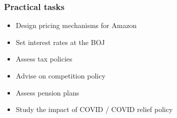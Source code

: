 \documentclass[
    xcolor={svgnames,dvipsnames},
    hyperref={colorlinks, citecolor=DeepPink4, linkcolor=DarkRed, urlcolor=DarkBlue}
    ]{beamer}  %
\newcommand{\1}{\mathbbm 1}
\begin{document}
\begin{frame}
    \frametitle{Practical tasks}

    \begin{itemize}
        \item Design pricing mechanisms for Amazon
            \vspace{0.3em}
            \vspace{0.3em}
            \vspace{0.3em}
        \item Set interest rates at the BOJ
            \vspace{0.3em}
            \vspace{0.3em}
            \vspace{0.3em}
        \item Assess tax policies
            \vspace{0.3em}
            \vspace{0.3em}
            \vspace{0.3em}
        \item Advise on competition policy 
            \vspace{0.3em}
            \vspace{0.3em}
            \vspace{0.3em}
        \item Assess pension plans
            \vspace{0.3em}
            \vspace{0.3em}
            \vspace{0.3em}
        \item Study the impact of COVID / COVID relief policy
    \end{itemize}


\end{frame}
\end{document}
